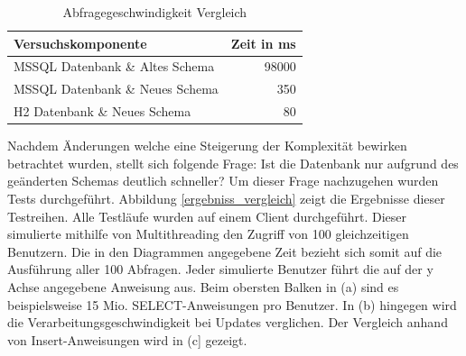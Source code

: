 \begin{table}[htbp]
\centering
\begin{tabular} {l | r}
Versuchskomponente & Zeit in ms  \\ \hline
MSSQL Datenbank \& Altes Schema & 98000 \\
MSSQL Datenbank \& Neues Schema & 350 \\
H2 Datenbank \& Neues Schema & 80 \\
\end{tabular}
\caption{Abfragegeschwindigkeit Vergleich}
\label{tb:vergleichAbfragegeschwindigkeit}
\end{table}

Nachdem Änderungen welche eine Steigerung der Komplexität bewirken betrachtet wurden, stellt sich folgende Frage: Ist die Datenbank nur aufgrund des geänderten Schemas deutlich schneller? Um dieser Frage nachzugehen wurden Tests durchgeführt. Abbildung \ref{ergebniss_vergleich} zeigt die Ergebnisse dieser Testreihen. Alle Testläufe wurden auf einem Client durchgeführt. Dieser simulierte mithilfe von Multithreading den Zugriff von 100 gleichzeitigen Benutzern. Die in den Diagrammen angegebene Zeit bezieht sich somit auf die Ausführung aller 100 Abfragen. Jeder simulierte Benutzer führt die auf der y Achse angegebene Anweisung aus. Beim obersten Balken in (a) sind es beispielsweise 15 Mio. SELECT-Anweisungen pro Benutzer. In (b) hingegen wird die Verarbeitungsgeschwindigkeit bei Updates verglichen. Der Vergleich anhand von Insert-Anweisungen wird in (c] gezeigt.    

